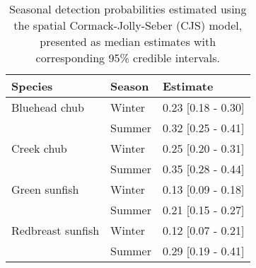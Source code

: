 \begin{table}[ht]
\centering
\caption{Seasonal detection probabilities estimated using the spatial Cormack-Jolly-Seber (CJS) model, presented as median estimates with corresponding 95\% credible intervals.} 
\label{tab:detection}
\begin{tabular}{lll}
  \hline
Species & Season & Estimate \\ 
  \hline
Bluehead chub & Winter & 0.23 [0.18 - 0.30] \\ 
   & Summer & 0.32 [0.25 - 0.41] \\ 
  Creek chub & Winter & 0.25 [0.20 - 0.31] \\ 
   & Summer & 0.35 [0.28 - 0.44] \\ 
  Green sunfish & Winter & 0.13 [0.09 - 0.18] \\ 
   & Summer & 0.21 [0.15 - 0.27] \\ 
  Redbreast sunfish & Winter & 0.12 [0.07 - 0.21] \\ 
   & Summer & 0.29 [0.19 - 0.41] \\ 
   \hline
\end{tabular}
\end{table}
